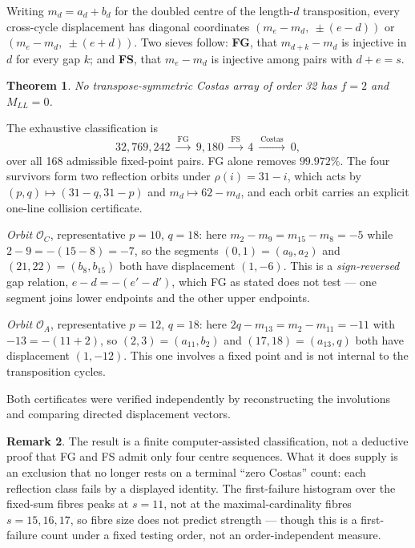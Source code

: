 \documentclass[11pt,a4paper]{article}
\newtheorem{theorem}{Theorem}[section]
\theoremstyle{definition}
\newtheorem{remark}[theorem]{Remark}
\begin{document}
Writing $m_d=a_d+b_d$ for the doubled centre of the length-$d$ transposition,
every cross-cycle displacement has diagonal coordinates
$(m_e-m_d,\ \pm(e-d))$ or $(m_e-m_d,\ \pm(e+d))$. Two sieves follow:
\textbf{FG}, that $m_{d+k}-m_d$ is injective in $d$ for every gap $k$; and
\textbf{FS}, that $m_e-m_d$ is injective among pairs with $d+e=s$.

\begin{theorem}
\label{thm:f2closed}
No transpose-symmetric Costas array of order 32 has $f=2$ and $M_{LL}=0$.
\end{theorem}

The exhaustive classification is
\[
32{,}769{,}242 \ \xrightarrow{\ \mathrm{FG}\ }\ 9{,}180
\ \xrightarrow{\ \mathrm{FS}\ }\ 4
\ \xrightarrow{\ \text{Costas}\ }\ 0 ,
\]
over all 168 admissible fixed-point pairs. FG alone removes $99.972\%$. The four
survivors form two reflection orbits under $\rho(i)=31-i$, which acts by
$(p,q)\mapsto(31-q,31-p)$ and $m_d\mapsto62-m_d$, and each orbit carries an
explicit one-line collision certificate.

\emph{Orbit $\mathcal O_C$}, representative $p=10$, $q=18$: here
$m_2-m_9=m_{15}-m_8=-5$ while $2-9=-(15-8)=-7$, so the segments $(0,1)=(a_9,a_2)$
and $(21,22)=(b_8,b_{15})$ both have displacement $(1,-6)$. This is a
\emph{sign-reversed} gap relation, $e-d=-(e'-d')$, which FG as stated does not
test --- one segment joins lower endpoints and the other upper endpoints.

\emph{Orbit $\mathcal O_A$}, representative $p=12$, $q=18$: here
$2q-m_{13}=m_2-m_{11}=-11$ with $-13=-(11+2)$, so $(2,3)=(a_{11},b_2)$ and
$(17,18)=(a_{13},q)$ both have displacement $(1,-12)$. This one involves a fixed
point and is not internal to the transposition cycles.

Both certificates were verified independently by reconstructing the involutions
and comparing directed displacement vectors.

\begin{remark}
The result is a finite computer-assisted classification, not a deductive proof
that FG and FS admit only four centre sequences. What it does supply is an
exclusion that no longer rests on a terminal ``zero Costas'' count: each
reflection class fails by a displayed identity. The first-failure histogram over
the fixed-sum fibres peaks at $s=11$, not at the maximal-cardinality fibres
$s=15,16,17$, so fibre size does not predict strength --- though this is a
first-failure count under a fixed testing order, not an order-independent measure.
\end{remark}
\end{document}
